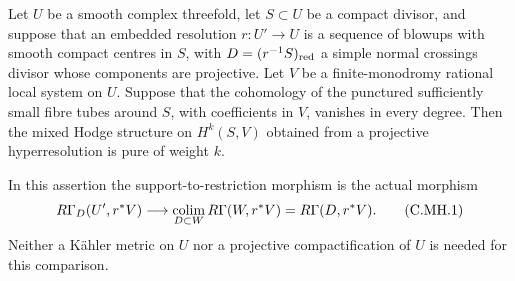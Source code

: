 \begin{proposition}\label{cdp:st:C.2.MH.1}

Let $U$ be a smooth complex threefold, let $S\subset U$ be a
compact divisor, and suppose that an embedded resolution
$r:U'\to U$ is a sequence of blowups with smooth compact
centres in $S$, with $D=(r^{-1}S)_{\rm red}$ a simple
normal crossings divisor whose components are projective.
Let $V$ be a finite-monodromy rational local system on $U$.
Suppose that the cohomology of the punctured sufficiently
small fibre tubes around $S$, with coefficients in $V$,
vanishes in every degree. Then the mixed Hodge structure
on $H^k(S,V)$ obtained from a projective hyperresolution
is pure of weight $k$.

In this assertion the support-to-restriction morphism is
the actual morphism
\[
 R\Gamma_D(U',r^*V)\longrightarrow
 \underset{D\subset W}{\mathop{\rm colim}}\,
 R\Gamma(W,r^*V)=R\Gamma(D,r^*V).
 \tag{C.MH.1}\label{cdp:eq:C.MH.1}
\]
Neither a K\"ahler metric on $U$ nor a projective
compactification of $U$ is needed for this comparison.
\end{proposition}


